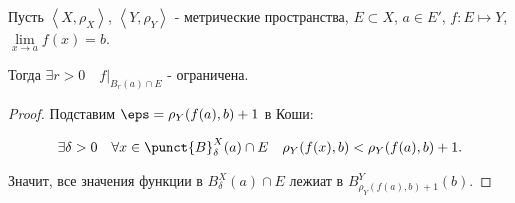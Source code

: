 \begin{theorem} \thmslashn

    Пусть $\left<X, \rho_{X}\right>$, $\left<Y, \rho_{Y}\right>$ - метрические пространства, $E \subset X$, $a\in E'$, $f : E \mapsto Y$, $\lim\limits_{x \to a} f(x) = b$.

    Тогда $\exists{r > 0}\quad \left. f\right|_{B_{r}(a)\cap E}$ - ограничена.
        \begin{proof} \thmslashn
        
            Подставим $\eps=\rho_{Y}(f(a), b) + 1$ в Коши:

            \[ \exists{\delta > 0}\quad \forall{x\in \punct{B}^{X}_{\delta}(a)\cap E}\quad \rho_{Y}(f(x), b) < \rho_{Y}(f(a), b) + 1 .\]

            Значит, все значения функции в $B^{X}_{\delta}(a)\cap E$ лежиат в $B^{Y}_{\rho_{Y}(f(a), b) + 1}(b)$.
        \end{proof}
\end{theorem}
